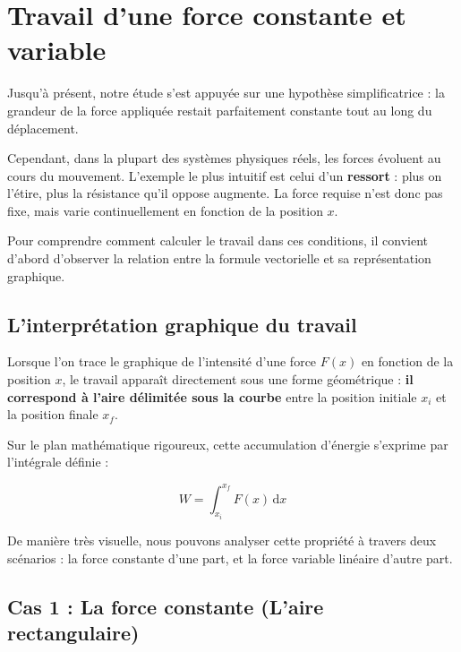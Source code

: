 \documentclass[11pt,openany]{book}
\begin{document}

\section{Travail d'une force constante et variable}

Jusqu'à présent, notre étude s'est appuyée sur une hypothèse simplificatrice : la grandeur de la force appliquée restait parfaitement constante tout au long du déplacement. 

Cependant, dans la plupart des systèmes physiques réels, les forces évoluent au cours du mouvement. L'exemple le plus intuitif est celui d'un \textbf{ressort} : plus on l'étire, plus la résistance qu'il oppose augmente. La force requise n'est donc pas fixe, mais varie continuellement en fonction de la position $x$.

Pour comprendre comment calculer le travail dans ces conditions, il convient d'abord d'observer la relation entre la formule vectorielle et sa représentation graphique.

\subsection{L'interprétation graphique du travail}

Lorsque l'on trace le graphique de l'intensité d'une force $F(x)$ en fonction de la position $x$, le travail apparaît directement sous une forme géométrique : \textbf{il correspond à l'aire délimitée sous la courbe} entre la position initiale $x_i$ et la position finale $x_f$.

Sur le plan mathématique rigoureux, cette accumulation d'énergie s'exprime par l'intégrale définie :

\[
\boxed{W = \int_{x_i}^{x_f} F(x) \, \mathrm{d}x}
\]

De manière très visuelle, nous pouvons analyser cette propriété à travers deux scénarios : la force constante d'une part, et la force variable linéaire d'autre part.

\subsection{Cas 1 : La force constante (L'aire rectangulaire)}
\end{document}

